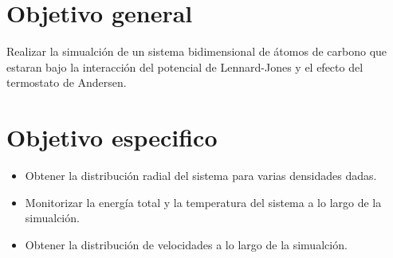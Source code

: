 \section{Objetivo general}
Realizar la simualción de un sistema bidimensional de átomos de carbono que estaran bajo la interacción del potencial de 
Lennard-Jones y el efecto del termostato de Andersen.
\section{Objetivo especifico}
\begin{itemize}
    \item Obtener la distribución radial del sistema para varias densidades dadas.
    \item Monitorizar la energía total y la temperatura del sistema a lo largo de la simualción.
    \item Obtener la distribución de velocidades a lo largo de la simualción.
\end{itemize}